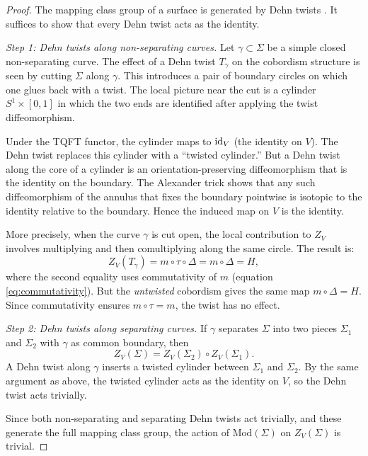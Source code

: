 \begin{proof}
The mapping class group of a surface is generated by Dehn twists \cite{Dehn1938,Lickorish1962}. It suffices to show that every Dehn twist acts as the identity.

\medskip

\noindent\emph{Step 1: Dehn twists along non-separating curves.}
Let $\gamma \subset \Sigma$ be a simple closed non-separating curve. The effect of a Dehn twist $T_\gamma$ on the cobordism structure is seen by cutting $\Sigma$ along $\gamma$. This introduces a pair of boundary circles on which one glues back with a twist. The local picture near the cut is a cylinder $S^1 \times [0,1]$ in which the two ends are identified after applying the twist diffeomorphism.

Under the TQFT functor, the cylinder maps to $\operatorname{id}_V$ (the identity on $V$). The Dehn twist replaces this cylinder with a ``twisted cylinder.'' But a Dehn twist along the core of a cylinder is an orientation-preserving diffeomorphism that is the identity on the boundary. The Alexander trick shows that any such diffeomorphism of the annulus that fixes the boundary pointwise is isotopic to the identity relative to the boundary. Hence the induced map on $V$ is the identity.

More precisely, when the curve $\gamma$ is cut open, the local contribution to $Z_V$ involves multiplying and then comultiplying along the same circle. The result is:
\begin{equation}\label{eq:dehn-twist-local}
Z_V(T_\gamma) = m \circ \tau \circ \Delta = m \circ \Delta = H,
\end{equation}
where the second equality uses commutativity of $m$ (equation \eqref{eq:commutativity}). But the \emph{untwisted} cobordism gives the same map $m \circ \Delta = H$. Since commutativity ensures $m \circ \tau = m$, the twist has no effect.

\medskip

\noindent\emph{Step 2: Dehn twists along separating curves.}
If $\gamma$ separates $\Sigma$ into two pieces $\Sigma_1$ and $\Sigma_2$ with $\gamma$ as common boundary, then
\begin{equation}\label{eq:separating-dehn}
Z_V(\Sigma) = Z_V(\Sigma_2) \circ Z_V(\Sigma_1).
\end{equation}
A Dehn twist along $\gamma$ inserts a twisted cylinder between $\Sigma_1$ and $\Sigma_2$. By the same argument as above, the twisted cylinder acts as the identity on $V$, so the Dehn twist acts trivially.

\medskip

\noindent Since both non-separating and separating Dehn twists act trivially, and these generate the full mapping class group, the action of $\mathrm{Mod}(\Sigma)$ on $Z_V(\Sigma)$ is trivial.
\end{proof}

